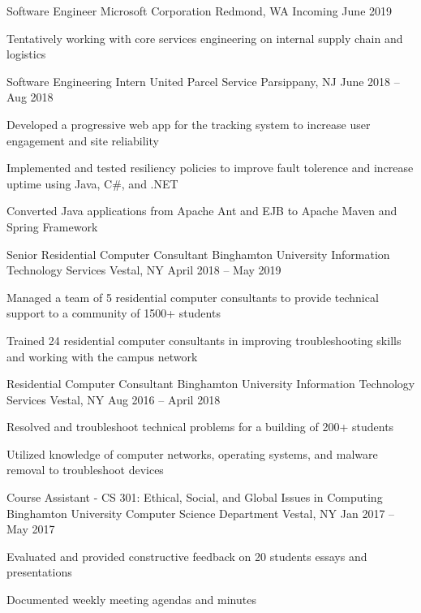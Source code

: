 \documentclass[]{awesome-cv}
\begin{document}
\begin{cventries}
	\cventry
    {Software Engineer}
	{Microsoft Corporation}
	{Redmond, WA}
	{Incoming June 2019}
	{\begin{cvitems}
		\item {Tentatively working with core services engineering on internal supply chain and logistics}
	\end{cvitems}}
	\cventry
    {Software Engineering Intern}
	{United Parcel Service}
	{Parsippany, NJ}
	{June 2018 – Aug 2018}
	{\begin{cvitems}
		\item {Developed a progressive web app for the tracking system to increase user engagement and site reliability}
		\item {Implemented and tested resiliency policies to improve fault tolerence and increase uptime using Java, C\#, and .NET}
		\item {Converted Java applications from Apache Ant and EJB to Apache Maven and Spring Framework}
	\end{cvitems}}
	\cventry
	{Senior Residential Computer Consultant}
	{Binghamton University Information Technology Services}
	{Vestal, NY}
	{April 2018 – May 2019}
	{\begin{cvitems}
		\item {Managed a team of 5 residential computer consultants to provide technical support to a community of 1500+ students}
		\item {Trained 24 residential computer consultants in improving troubleshooting skills and working with the campus network}
	\end{cvitems}}
	\cventry
	{Residential Computer Consultant}
	{Binghamton University Information Technology Services}
	{Vestal, NY}
	{Aug 2016 – April 2018}
	{\begin{cvitems}
		\item {Resolved and troubleshoot technical problems for a building of 200+ students}
		\item {Utilized knowledge of computer networks, operating systems, and malware removal to troubleshoot devices}
	\end{cvitems}}
	\cventry
	{Course Assistant - CS 301: Ethical, Social, and Global Issues in Computing}
	{Binghamton University Computer Science Department}
	{Vestal, NY}
	{Jan 2017 – May 2017}
	{\begin{cvitems}
		\item {Evaluated and provided constructive feedback on 20 students\textquotesingle{} essays and presentations}
		\item {Documented weekly meeting agendas and minutes}
	\end{cvitems}}
\end{cventries}
\vspace{-2mm}
\end{document}
